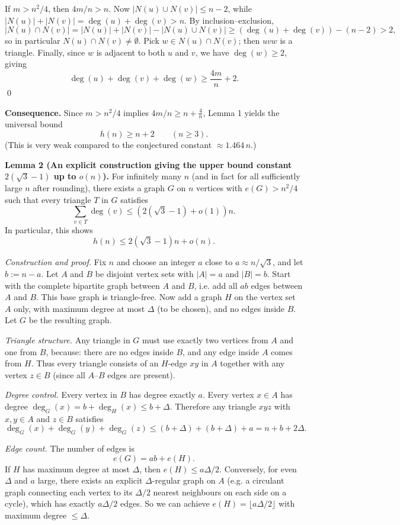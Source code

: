 If $m>n^2/4$, then $4m/n>n$.
Now $|N(u)\cup N(v)|\le n-2$, while $|N(u)|+|N(v)|=\deg(u)+\deg(v)>n$.
By inclusion--exclusion,
\[
|N(u)\cap N(v)| = |N(u)|+|N(v)|-|N(u)\cup N(v)| \ge (\deg(u)+\deg(v))-(n-2) > 2,
\]
so in particular $N(u)\cap N(v)\neq\emptyset$.
Pick $w\in N(u)\cap N(v)$; then $uvw$ is a triangle.
Finally, since $w$ is adjacent to both $u$ and $v$, we have $\deg(w)\ge 2$, giving
\[
\deg(u)+\deg(v)+\deg(w) \ge \frac{4m}{n} + 2.
\]
\qed

\medskip
\textbf{Consequence.} Since $m>n^2/4$ implies $4m/n\ge n+\frac{4}{n}$, Lemma 1 yields the universal bound
\[
 h(n) \ge n+2 \qquad (n\ge 3).
\]
(This is very weak compared to the conjectured constant $\approx 1.464\,n$.)

\medskip
\textbf{Lemma 2 (An explicit construction giving the upper bound constant $2(\sqrt{3}-1)$ up to $o(n)$).}
For infinitely many $n$ (and in fact for all sufficiently large $n$ after rounding), there exists a graph $G$ on $n$ vertices with $e(G)>n^2/4$ such that every triangle $T$ in $G$ satisfies
\[
\sum_{v\in T} \deg(v) \le \left(2(\sqrt{3}-1)+o(1)\right)n.
\]
In particular, this shows
\[
 h(n) \le 2(\sqrt{3}-1)n + o(n).
\]

\emph{Construction and proof.}
Fix $n$ and choose an integer $a$ close to $a\approx n/\sqrt{3}$, and let $b:=n-a$.
Let $A$ and $B$ be disjoint vertex sets with $|A|=a$ and $|B|=b$.
Start with the complete bipartite graph between $A$ and $B$, i.e. add all $ab$ edges between $A$ and $B$.
This base graph is triangle-free.
Now add a graph $H$ on the vertex set $A$ only, with maximum degree at most $\Delta$ (to be chosen), and no edges inside $B$.
Let $G$ be the resulting graph.

\emph{Triangle structure.}
Any triangle in $G$ must use exactly two vertices from $A$ and one from $B$, because:
there are no edges inside $B$, and any edge inside $A$ comes from $H$.
Thus every triangle consists of an $H$-edge $xy$ in $A$ together with any vertex $z\in B$ (since all $A$--$B$ edges are present).

\emph{Degree control.}
Every vertex in $B$ has degree exactly $a$.
Every vertex $x\in A$ has degree $\deg_G(x)=b+\deg_H(x)\le b+\Delta$.
Therefore any triangle $xyz$ with $x,y\in A$ and $z\in B$ satisfies
\[
\deg_G(x)+\deg_G(y)+\deg_G(z) \le (b+\Delta)+(b+\Delta)+a = n + b + 2\Delta. \tag{5}
\]

\emph{Edge count.}
The number of edges is
\[
 e(G)=ab + e(H).
\]
If $H$ has maximum degree at most $\Delta$, then $e(H)\le a\Delta/2$.
Conversely, for even $\Delta$ and $a$ large, there exists an explicit $\Delta$-regular graph on $A$ (e.g. a circulant graph connecting each vertex to its $\Delta/2$ nearest neighbours on each side on a cycle), which has exactly $a\Delta/2$ edges.
So we can achieve $e(H)=\lfloor a\Delta/2\rfloor$ with maximum degree $\le\Delta$.

